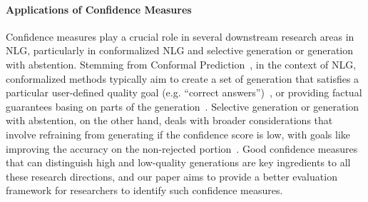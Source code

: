 \paragraph{Applications of Confidence Measures}
Confidence measures play a crucial role in several downstream research areas in NLG, particularly in conformalized NLG and selective generation or generation with abstention. 
Stemming from Conformal Prediction~\cite{papadopoulos2007conformal}, in the context of NLG, conformalized methods typically aim to create a set of generation that satisfies a particular user-defined quality goal (e.g. ``correct answers'')~\cite{quach2023conformal,gui2024conformal,lee2024selective,yadkori2024mitigating}, or providing factual guarantees basing on parts of the generation~\cite{cherian2024large,mohri2024}.
Selective generation or generation with abstention, on the other hand, deals with broader considerations that involve refraining from generating if the confidence score is low, with goals like improving the accuracy on the non-rejected portion~\cite{MCConf-pmlr-v239-ren23a,cole2023selectively}.
Good confidence measures that can distinguish high and low-quality generations are key ingredients to all these research directions, and our paper aims to provide a better evaluation framework for researchers to identify such confidence measures.
